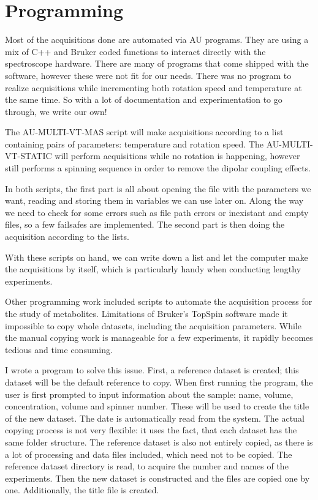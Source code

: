 \documentclass[12pt]{article}
\begin{document}
\section{Programming}

Most of the acquisitions done are automated via AU programs. They are using a mix of C++ and Bruker coded functions to interact directly with the spectroscope hardware. There are many of programs that come shipped with the software, however these were not fit for our needs. There was no program to realize acquisitions while incrementing both rotation speed and temperature at the same time. So with a lot of documentation and experimentation to go through, we write our own!

The AU-MULTI-VT-MAS script will make acquisitions according to a list containing pairs of parameters: temperature and rotation speed. The AU-MULTI-VT-STATIC will perform acquisitions while no rotation is happening, however still performs a spinning sequence in order to remove the dipolar coupling effects.

In both scripts, the first part is all about opening the file with the parameters we want, reading and storing them in variables we can use later on. Along the way we need to check for some errors such as file path errors or inexistant and empty files, so a few failsafes are implemented. The second part is then doing the acquisition according to the lists.

With these scripts on hand, we can write down a list and let the computer make the acquisitions by itself, which is particularly handy when conducting lengthy experiments.

Other programming work included scripts to automate the acquisition process for the study of metabolites. Limitations of Bruker's TopSpin software made it impossible to copy whole datasets, including the acquisition parameters. While the manual copying work is manageable for a few experiments, it rapidly becomes tedious and time consuming. 

I wrote a program to solve this issue. First, a reference dataset is created; this dataset will be the default reference to copy. When first running the program, the user is first prompted to input information about the sample: name, volume, concentration, volume and spinner number. These will be used to create the title of the new dataset. The date is automatically read from the system. The actual copying process is not very flexible: it uses the fact, that each dataset has the same folder structure. The reference dataset is also not entirely copied, as there is a lot of processing and data files included, which need not to be copied. The reference dataset directory is read, to acquire the number and names of the experiments. Then the new dataset is constructed and the files are copied one by one. Additionally, the title file is created.
\end{document}
